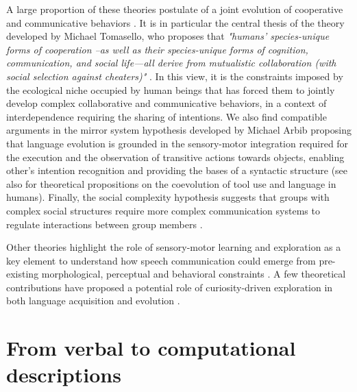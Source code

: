 \documentclass[letterpaper]{article} %
\begin{document}
A large proportion of these theories postulate of a joint evolution of cooperative and communicative behaviors \cite{Smith2010,gardenfors2002cooperation,Ghazanfar2014,Tomasello2012}. It is in particular the central thesis of the theory developed by Michael Tomasello, who proposes that \textit{"humans' species-unique forms of cooperation --as well as their species-unique forms of cognition, communication, and social life—all derive from mutualistic collaboration (with social selection against cheaters)"} \cite{Tomasello2012} . In this view, it is the constraints imposed by the ecological niche occupied by human beings that has forced them to jointly develop complex collaborative and communicative behaviors, in a context of interdependence requiring the sharing of intentions. We also find compatible arguments in the mirror system hypothesis developed by Michael Arbib \cite{arbib_monkey-like_2005} proposing that language evolution is grounded in the sensory-motor integration required for the execution and the observation of transitive actions towards objects, enabling other's intention recognition and providing the bases of a syntactic structure \cite{Roy2005} (see also \cite{Iriki2012} for theoretical propositions on the coevolution of tool use and language in humans). Finally, the social complexity hypothesis suggests that groups with complex social structures require more complex communication systems to regulate interactions between group members \cite{Freeberg2012}.

Other theories highlight the role of sensory-motor learning and exploration as a key element to understand how speech communication could emerge from pre-existing morphological, perceptual and behavioral constraints \cite{lindblom1984,macneilage98,Schwartz2012a}. A few theoretical contributions have proposed a potential role of curiosity-driven exploration in both language acquisition \cite{Oller2000} and evolution \cite{oudeyer_smith_evo_devo}.  

\section{From verbal to computational descriptions}
\end{document}
